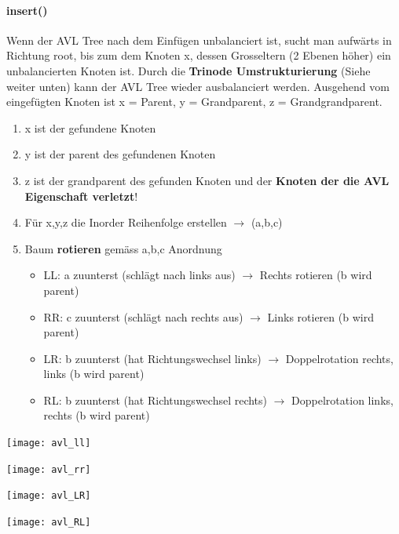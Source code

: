 \paragraph{insert()}
Wenn der AVL Tree nach dem Einfügen unbalanciert ist, sucht man aufwärts in Richtung root, bis zum dem Knoten x, dessen Grosseltern (2 Ebenen höher) ein unbalancierten Knoten ist. Durch die \textbf{Trinode Umstrukturierung} (Siehe weiter unten) kann der AVL Tree wieder ausbalanciert werden. Ausgehend vom eingefügten Knoten ist x = Parent, y = Grandparent, z = Grandgrandparent.
\begin{enumerate}
	\item x ist der gefundene Knoten
	\item y ist der parent des gefundenen Knoten
	\item z ist der grandparent des gefunden Knoten und der \textbf{Knoten der die AVL Eigenschaft verletzt}!
	\item Für x,y,z die Inorder Reihenfolge erstellen $\rightarrow$ (a,b,c)
	\item Baum \textbf{rotieren} gemäss a,b,c Anordnung
	\begin{itemize}
		\item LL: a zuunterst (schlägt nach links aus) $\rightarrow$ Rechts rotieren (b wird parent)
		\item RR: c zuunterst (schlägt nach rechts aus) $\rightarrow$ Links rotieren (b wird parent)
		\item LR: b zuunterst (hat Richtungswechsel links) $\rightarrow$ Doppelrotation rechts, links (b wird parent)
		\item RL: b zuunterst (hat Richtungswechsel rechts) $\rightarrow$ Doppelrotation links, rechts (b wird parent)
	\end{itemize}
\end{enumerate}
\begin{minipage}[t]{1\textwidth}
	\centering
	\texttt{[image: avl\_ll]}
	\label{fig:LL}
\end{minipage}
\clearpage
\begin{minipage}[t]{1\textwidth}
	\centering
	\texttt{[image: avl\_rr]}
	\label{fig:RR}
\end{minipage}
\begin{minipage}[t]{1\textwidth}
	\centering
	\texttt{[image: avl\_LR]}
	\label{fig:LR}
\end{minipage}
\begin{minipage}[t]{1\textwidth}
	\centering
	\texttt{[image: avl\_RL]}
	\label{fig:RL}
\end{minipage}
